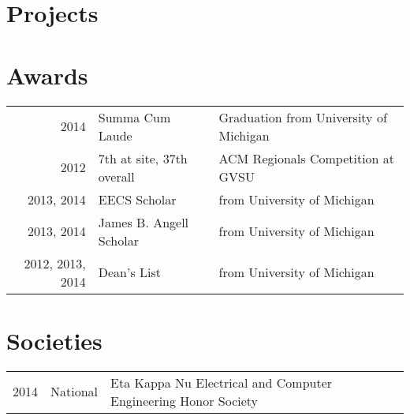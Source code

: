 \documentclass[]{deedy-resume-openfont}
\begin{document}
\begin{minipage}[t]{0.66\textwidth}
\section{Projects}
\iffalse
\runsubsection{Cornell Robot Learning Lab}
\descript{| Head Undergrad Research}
\location{Jan 2014 – Present | Ithaca, NY}
Worked with \textbf{\href{http://www.cs.cornell.edu/~ashesh/}{Ashesh Jain}} and \textbf{\href{http://www.cs.cornell.edu/~asaxena/}{Prof Ashutosh Saxena}} to create \textbf{PlanIt}, a tool which  learns from large scale user preference feedback to plan robot trajectories in human environments.  Publication submitted.
\sectionsep

\runsubsection{Cornell Phonetics Lab}
\descript{| Head Undergraduate Researcher}
\location{Mar 2012 – May 2013 | Ithaca, NY}
Lead the development of \textbf{QuickTongue}, the first ever breakthrough tongue-controlled game with \textbf{\href{http://conf.ling.cornell.edu/~tilsen/}{Prof Sam Tilsen}} to aid in Linguistics research. Publication submitted.
\sectionsep
\fi

\section{Awards} 
\begin{tabular}{rll}
2014	& Summa Cum Laude & Graduation from University of Michigan\\
2012 	& 7th at site, 37th overall & ACM Regionals Competition at GVSU \\
2013, 2014 	& EECS Scholar 		& from University of Michigan \\
2013, 2014 	& James B. Angell Scholar 	& from University of Michigan \\
2012, 2013, 2014 	& Dean's List 		& from University of Michigan \\
\end{tabular}
\sectionsep


\section{Societies} 

\begin{tabular}{rll}
2014 	& National    & Eta Kappa Nu Electrical and Computer Engineering Honor Society \\
\end{tabular}
\sectionsep

\end{minipage} 
\end{document}
